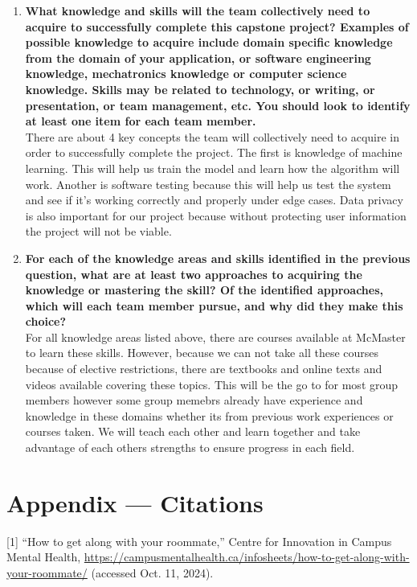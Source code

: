 \documentclass{scrreprt}
\theoremstyle{definition}
\begin{document}
\begin{enumerate}
  \item \textbf{What knowledge and skills will the team collectively need to acquire to
  successfully complete this capstone project?  Examples of possible knowledge
  to acquire include domain specific knowledge from the domain of your
  application, or software engineering knowledge, mechatronics knowledge or
  computer science knowledge.  Skills may be related to technology, or writing,
  or presentation, or team management, etc.  You should look to identify at
  least one item for each team member.}\\
There are about 4 key concepts the team will collectively need to acquire in order to successfully complete the project. The first is knowledge of machine learning. This will help us train the model and learn how the algorithm will work. Another is software testing because this will help us test the system and see if it's working correctly and properly under edge cases. Data privacy is also important for our project because without protecting user information the project will not be viable.
  \item \textbf{For each of the knowledge areas and skills identified in the previous
  question, what are at least two approaches to acquiring the knowledge or
  mastering the skill?  Of the identified approaches, which will each team
  member pursue, and why did they make this choice?}\\
For all knowledge areas listed above, there are courses available at McMaster to learn these skills. However, because we can not take all these courses because of elective restrictions, there are textbooks and online texts and videos available covering these topics. This will be the go to for most group members however some group memebrs already have experience and knowledge in these domains whether its from previous work experiences or courses taken. We will teach each other and learn together and take advantage of each others strengths to ensure progress in each field. 
\end{enumerate}

\newpage{}
\section*{Appendix --- Citations}
[1] “How to get along with your roommate,” Centre for Innovation in Campus Mental Health, \href{https://campusmentalhealth.ca/infosheets/how-to-get-along-with-your-roommate/}{https://campusmentalhealth.ca/infosheets/how-to-get-along-with-your-roommate/} (accessed Oct. 11, 2024).

\end{document}
